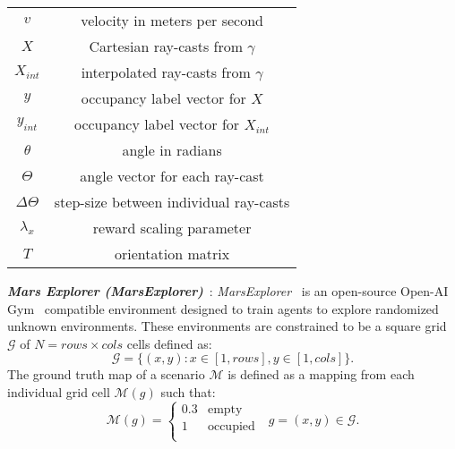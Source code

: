 \begin{table}[h]
\begin{center}
\begin{tabular}{c|c}
$v$               & velocity in meters per second            \\
$X$               & Cartesian ray-casts from $\gamma$        \\
$X_{int}$         & interpolated ray-casts from $\gamma$     \\
$y$               & occupancy label vector for $X$           \\
$y_{int}$         & occupancy label vector for $X_{int}$     \\
$\theta$          & angle in radians                         \\
$\Theta$          & angle vector for each ray-cast           \\
$\Delta\Theta$    & step-size between individual ray-casts   \\
$\lambda_x$       & reward scaling parameter                 \\
$T$               & orientation matrix                       \\


\end{tabular}
\end{center}
\end{table}
\endgroup

\textbf{\textit{Mars Explorer (MarsExplorer)}}~\cite{Koutras2021MarsExplorer}: \textit{MarsExplorer}~\cite{Koutras2021MarsExplorer} is an open-source Open-AI Gym~\cite{gym} compatible environment designed to train agents to explore randomized unknown environments. These environments are constrained to be a square grid $\mathcal{G}$ of $N=rows\times cols$ cells defined as:
\begin{equation}
    \mathcal{G} = \{(x, y): x\in[1,rows],y\in[1, cols] \}.
\end{equation}
The ground truth map of a scenario $\mathcal{M}$ is defined as a mapping from each individual grid cell $\mathcal{M}(g)$ such that:
\begin{equation}
    \mathcal{M}(g) = 
        \begin{cases} 
        0.3 & \text{empty} \\
        1 & \text{occupied} \\
        \end{cases} \hspace{8pt} g = (x, y) \in \mathcal{G}.
\end{equation}

